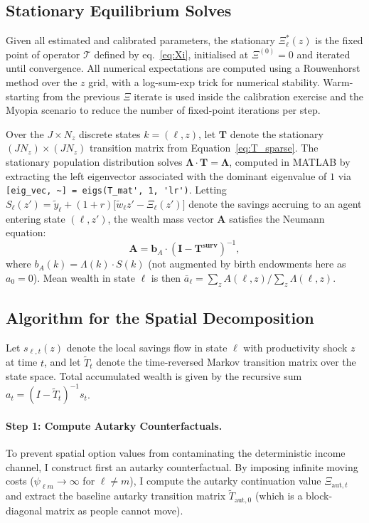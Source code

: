 \documentclass[11pt, a4paper]{article}
\begin{document}
\subsection{Stationary Equilibrium Solves}
Given all estimated and calibrated parameters, the stationary $\Xi^*_\ell(z)$ is the fixed point of operator $\mathcal{T}$ defined by eq.~\eqref{eq:Xi}, initialised at $\Xi^{(0)} = 0$ and iterated until convergence. All numerical expectations are computed using a Rouwenhorst method over the $z$ grid, with a log-sum-exp trick for numerical stability. Warm-starting from the previous $\Xi$ iterate is used inside the calibration exercise and the Myopia scenario to reduce the number of fixed-point iterations per step.

Over the $J \times N_z$ discrete states $k = (\ell, z)$, let $\mathbf{T}$ denote the stationary $(J N_z) \times (J N_z)$ transition matrix from Equation~\eqref{eq:T_sparse}. The stationary population distribution solves $\boldsymbol{\Lambda} \cdot \mathbf{T} = \boldsymbol{\Lambda}$, computed in MATLAB by extracting the left eigenvector associated with the dominant eigenvalue of $1$ via \verb|[eig_vec, ~] = eigs(T_mat', 1, 'lr')|. Letting $S_\ell(z') = \tilde y_\ell + (1+r)\bigl[\tilde w_\ell z' - \Xi_\ell(z')\bigr]$ denote the savings accruing to an agent entering state $(\ell, z')$, the wealth mass vector $\mathbf{A}$ satisfies the Neumann equation:
\begin{equation}
  \mathbf{A} = \boldsymbol{b}_A \cdot (\mathbf{I} - \mathbf{T^{\text{surv}}})^{-1},
  \label{eq:A_inv}
\end{equation}
where $b_A(k) = \Lambda(k) \cdot S(k)$ (not augmented by birth endowments here as $a_0 = 0$). Mean wealth in state $\ell$ is then $\bar a_\ell = \sum_{z} A(\ell, z) / \sum_{z} \Lambda(\ell, z)$.

\subsection{Algorithm for the Spatial Decomposition}
\label{sec:algorithm_spatial_decomp}

Let $s_{\ell,t}(z)$ denote the local savings flow in state $\ell$ with productivity shock $z$ at time $t$, and let $\tilde{T}_t$ denote the time-reversed Markov transition matrix over the state space. Total accumulated wealth is given by the recursive sum $a_t = (I - \tilde{T}_t)^{-1} s_t$.

\paragraph{Step 1: Compute Autarky Counterfactuals.} 
To prevent spatial option values from contaminating the deterministic income channel, I construct first an autarky counterfactual. By imposing infinite moving costs ($\psi_{\ell m} \to \infty$ for $\ell \neq m$), I compute the autarky continuation value $\Xi_{\text{aut}, t}$ and extract the baseline autarky transition matrix $\tilde{T}_{\text{aut}, 0}$ (which is a block-diagonal matrix as people cannot move).
\end{document}
